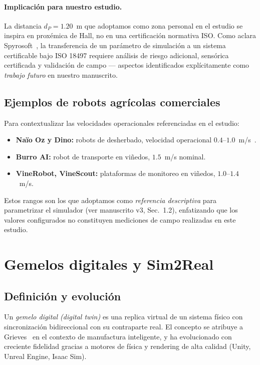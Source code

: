 \documentclass[12pt,a4paper,oneside]{book}
\begin{document}
\paragraph{Implicación para nuestro estudio.} La distancia $d_P = 1.20$~m que adoptamos como zona personal en el estudio se inspira en proxémica de Hall, no en una certificación normativa ISO. Como aclara Spyrosoft~\cite{Spyrosoft2024}, la transferencia de un parámetro de simulación a un sistema certificable bajo ISO 18497 requiere análisis de riesgo adicional, sensórica certificada y validación de campo --- aspectos identificados explícitamente como \emph{trabajo futuro} en nuestro manuscrito.

\subsection{Ejemplos de robots agrícolas comerciales}

Para contextualizar las velocidades operacionales referenciadas en el estudio:
\begin{itemize}
    \item \textbf{Naïo Oz y Dino:} robots de desherbado, velocidad operacional $0.4$--$1.0$~m/s~\cite{Tsolakis2024}.
    \item \textbf{Burro AI:} robot de transporte en viñedos, $1.5$~m/s nominal.
    \item \textbf{VineRobot, VineScout:} plataformas de monitoreo en viñedos, $1.0$--$1.4$~m/s.
\end{itemize}

Estos rangos son los que adoptamos como \emph{referencia descriptiva} para parametrizar el simulador (ver manuscrito v3, Sec.~1.2), enfatizando que los valores configurados no constituyen mediciones de campo realizadas en este estudio.

\newpage
\section{Gemelos digitales y Sim2Real}
\label{doc7:sec:digital}

\subsection{Definición y evolución}

Un \emph{gemelo digital (digital twin)} es una replica virtual de un sistema físico con sincronización bidireccional con su contraparte real. El concepto se atribuye a Grieves~\cite{Grieves2014} en el contexto de manufactura inteligente, y ha evolucionado con creciente fidelidad gracias a motores de física y rendering de alta calidad (Unity, Unreal Engine, Isaac Sim).
\end{document}
